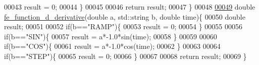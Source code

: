 \begin{DoxyCode}
00043     result = 0;
00044   \}
00045 
00046   \textcolor{keywordflow}{return} result;
00047 \}
00048 
\hyperlink{fe__function_8cpp_afb02d53011656285452b16427dcd08dd}{00049} \textcolor{keywordtype}{double} \hyperlink{fe__function_8cpp_afb02d53011656285452b16427dcd08dd}{fe\_function\_d\_derivative}(\textcolor{keywordtype}{double} a, std::string b, \textcolor{keywordtype}{double} time)\{
00050   \textcolor{keywordtype}{double} result;
00051 
00052   \textcolor{keywordflow}{if}(b==\textcolor{stringliteral}{"RAMP"})\{
00053     result = 0;
00054   \}
00055 
00056   \textcolor{keywordflow}{if}(b==\textcolor{stringliteral}{"SIN"})\{
00057     result = a*-1.0*sin(time);
00058   \}
00059 
00060   \textcolor{keywordflow}{if}(b==\textcolor{stringliteral}{"COS"})\{
00061     result = a*-1.0*cos(time);
00062   \}
00063 
00064   \textcolor{keywordflow}{if}(b==\textcolor{stringliteral}{"STEP"})\{
00065     result = 0;
00066   \}
00067 
00068   \textcolor{keywordflow}{return} result;
00069 \}
\end{DoxyCode}

